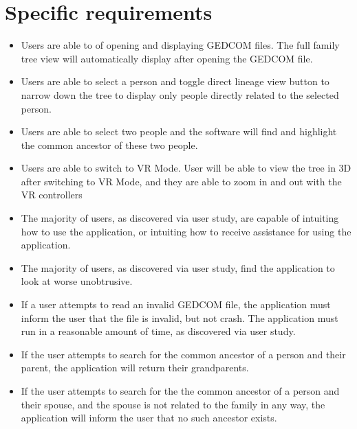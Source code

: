 \documentclass[onecolumn, draftclsnofoot, 10pt, compsoc]{IEEEtran}
\begin{document}
\section{Specific requirements}
\begin{itemize}
\item Users are able to of opening and displaying GEDCOM files. The full family tree view will automatically display after opening the GEDCOM file.
\item Users are able to select a person and toggle direct lineage view button to narrow down the tree to display only people directly related to the selected person.
\item Users are able to select two people and the software will find and highlight the common ancestor of these two people.
\item Users are able to switch to VR Mode. User will be able to view the tree in 3D after switching to VR Mode, and they are able to zoom in and out with the VR controllers
\item The majority of users, as discovered via user study, are capable of intuiting how to use the application, or intuiting how to receive assistance for using the application.
\item The majority of users, as discovered via user study, find the application to look at worse unobtrusive.
\item If a user attempts to read an invalid GEDCOM file, the application must inform the user that the file is invalid, but not crash.
The application must run in a reasonable amount of time, as discovered via user study.
\item If the user attempts to search for the common ancestor of a person and their parent, the application will return their grandparents.
\item If the user attempts to search for the the common ancestor of a person and their spouse, and the spouse is not related to the family in any way, the application will inform the user that no such ancestor exists.

\end{itemize}

\end{document}

